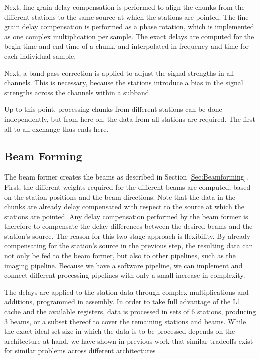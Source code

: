 \documentclass{llncs}
\begin{document}
Next, fine-grain delay compensation is performed to align the chunks from the different stations to the same source at which the stations are pointed. The fine-grain delay compensation is performed as a phase rotation, which is implemented as one complex multiplication per sample. The exact delays are computed for the begin time and end time of a chunk, and interpolated in frequency and time for each individual sample. %

Next, a band pass correction is applied to adjust the signal strengths in all channels. This is necessary, because the stations introduce a bias in the signal strengths across the channels within a subband.

Up to this point, processing chunks from different stations can be done independently, but from here on, the data from all stations are required. The first all-to-all exchange thus ends here.

\subsection{Beam Forming}

The beam former creates the beams as described in Section \ref{Sec:Beamforming}. First, the different weights required for the different beams are computed, based on the station positions and the beam directions. Note that the data in the chunks are already delay compensated with respect to the source at which the stations are pointed. Any delay compensation performed by the beam former is therefore to compensate the delay differences between the desired beams and the station's source. The reason for this two-stage approach is flexibility. By already compensating for the station's source in the previous step, the resulting data can not only be fed to the beam former, but also to other pipelines, such as the imaging pipeline. Because we have a software pipeline, we can implement and connect different processing pipelines with only a small increase in complexity.

The delays are applied to the station data through complex multiplications and additions, programmed in assembly. In order to take full advantage of the L1 cache and the available registers, data is processed in sets of 6 stations, producing 3 beams, or a subset thereof to cover the remaining stations and beams. While the exact ideal set size in which the data is to be processed depends on the architecture at hand, we have shown in previous work that similar tradeoffs exist for similar problems across different architectures~\cite{Nieuwpoort:09,BAR}.
\end{document}
